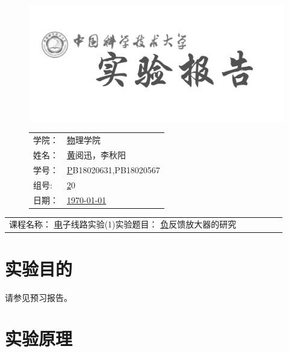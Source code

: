 \documentclass[a4paper,11pt,UTF8]{ctexart}
\newcommand{\major}{物理学院}
\newcommand{\name}{黄阅迅，李秋阳}
\newcommand{\stuid}{PB18020631,PB18020567}
\newcommand{\group}{20}
\newcommand{\newdate}{\today}
\newcommand{\course}{电子线路实验(1)}
\newcommand{\newtitle}{负反馈放大器的研究}
\begin{document}
\thispagestyle{empty}
\begin{figure}[h]
  \begin{minipage}{0.6\linewidth}
    \centerline{\includegraphics[width=\linewidth]{logo.png}}
  \end{minipage}
  \hfill
  \begin{minipage}{.4\linewidth}
    \raggedleft
    \begin{tabular*}{.8\linewidth}{ll}
      学院： & \underline\major   \\
      姓名： & \underline\name    \\
      学号： & \underline\stuid   \\
      组号:  & \underline\group   \\
      日期： & \underline\newdate \\
    \end{tabular*}
  \end{minipage}
\end{figure}

\begin{table}[!htbp]
  \centering
  \begin{tabular*}{\linewidth}{llllll}
    课程名称：  \underline\course   \qquad\qquad 实验题目：  \underline\newtitle  
  \end{tabular*}
\end{table}


\section{实验目的}

请参见预习报告。

\section{实验原理}
\end{document}
